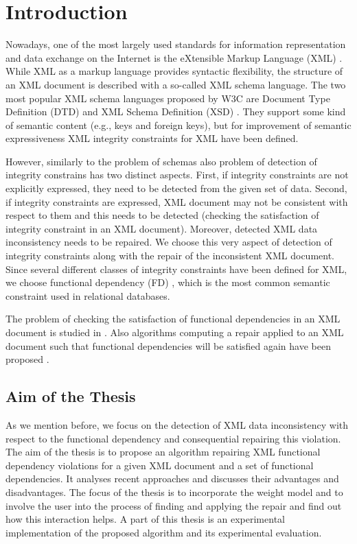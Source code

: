 \chapter{Introduction}

Nowadays, one of the most largely used standards for information representation and data exchange on the Internet is the eXtensible Markup Language (XML) \cite{xml}. While XML as a markup language provides syntactic flexibility, the structure of an XML document is described with a so-called XML schema language. The two most popular XML schema languages proposed by W3C are Document Type Definition (DTD) \cite{xml} and XML Schema Definition (XSD) \cite{xsd1,xsd2,xsd3}. They support some kind of semantic content (e.g., keys and foreign keys), but for improvement of semantic expressiveness XML integrity constraints for XML \cite{ic} have been defined.

However, similarly to the problem of schemas also problem of detection of integrity constrains has two distinct aspects. First, if integrity constraints are not explicitly expressed, they need to be detected from the given set of data. Second, if integrity constraints are expressed, XML document may not be consistent with respect to them and this needs to be detected (checking the satisfaction of integrity constraint in an XML document). Moreover, detected XML data inconsistency needs to be repaired. We choose this very aspect of detection of integrity constraints along with the repair of the inconsistent XML document. Since several different classes of integrity constraints have been defined for XML, we choose functional dependency (FD) \cite{fd}, which is the most common semantic constraint used in relational databases.

The problem of checking the satisfaction of functional dependencies in an XML document is studied in \cite{satifFD}. Also algorithms computing a repair applied to an XML document such that functional dependencies will be satisfied again have been proposed \cite{RepAndConsistentAnswer, QueryXML, ImprovingXML}.

\section{Aim of the Thesis}

As we mention before, we focus on the detection of XML data inconsistency with respect to the functional dependency and consequential repairing this violation. The aim of the thesis is to propose an algorithm repairing XML functional dependency violations for a given XML document and a set of functional dependencies. It analyses recent approaches and discusses their advantages and disadvantages. The focus of the thesis is to incorporate the weight model and to involve the user into the process of finding and applying the repair and find out how this interaction helps. A part of this thesis is an experimental implementation of the proposed algorithm and its experimental evaluation.

